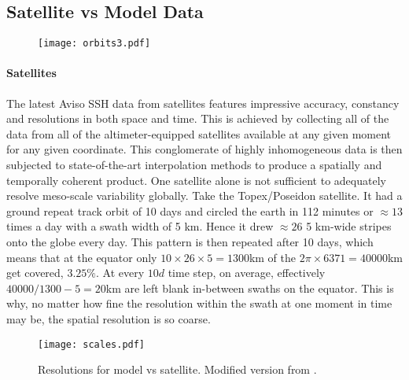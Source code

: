 
\subsection{Satellite vs Model Data} \label{subsec:satvsmod}




\begin{wrapfigure}[50]{r}{0.25\textwidth}

\texttt{[image: orbits3.pdf]}

\end{wrapfigure}

\paragraph{Satellites}The latest Aviso SSH data from satellites features impressive accuracy, constancy and resolutions in both space and time. This is achieved
by collecting all of the data from all of the altimeter-equipped satellites available at any given moment for any given coordinate. This conglomerate of highly
inhomogeneous data is then subjected to state-of-the-art interpolation methods to produce a spatially and temporally coherent product. One satellite alone is
not sufficient to adequately resolve meso-scale variability globally. Take \eg the Topex/Poseidon satellite. It had a ground repeat track orbit of 10 days and
circled the earth in 112 minutes or $\approx 13$ times a day with a swath width of 5 km. Hence it drew $\approx 26$ 5 km-wide stripes onto the globe every day.
This pattern is then repeated after 10 days, which means that at the equator only $10 \times 26 \times 5=1300$km of the $2\pi \times 6371=40000$km get covered,
\ie $3.25\%$. At every $10d$ time step, on average, effectively
$40000/1300-5= 20$km are left blank in-between swaths on the equator. This is why, no matter how fine the resolution within the swath at one moment in time may
be, the spatial resolution is so coarse.



\begin{wrapfigure}[20]{r}{0.6\textwidth}
\vspace{-8mm}
  \begin{center}
\texttt{[image: scales.pdf]}
 \end{center}
 \vspace{-5mm}
\caption{Resolutions for model vs satellite. Modified version from \cite{olbers2012ocean}.}
\end{wrapfigure}


